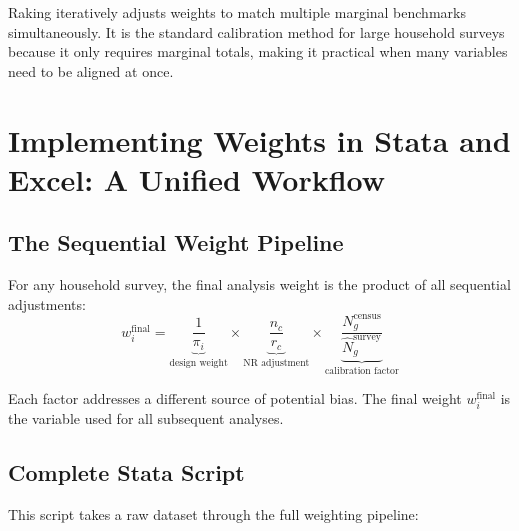 \documentclass[11pt,a4paper]{article}
\begin{document}
\begin{keytakeaway}
Raking iteratively adjusts weights to match multiple marginal benchmarks simultaneously. It is the standard calibration method for large household surveys because it only requires marginal totals, making it practical when many variables need to be aligned at once.
\end{keytakeaway}

\section{Implementing Weights in Stata and Excel: A Unified Workflow}

\subsection{The Sequential Weight Pipeline}
For any household survey, the final analysis weight is the product of all sequential adjustments:
\begin{equation}
  w_i^{\text{final}} = \underbrace{\frac{1}{\pi_i}}_{\text{design weight}} \times \underbrace{\frac{n_c}{r_c}}_{\text{NR adjustment}} \times \underbrace{\frac{N_g^{\text{census}}}{\hat{N}_g^{\text{survey}}}}_{\text{calibration factor}}
\end{equation}

Each factor addresses a different source of potential bias. The final weight $w_i^{\text{final}} $ is the variable used for all subsequent analyses.

\subsection{Complete Stata Script}
This script takes a raw dataset through the full weighting pipeline:
\end{document}
